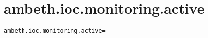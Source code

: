 \section{ambeth.ioc.monitoring.active}
\label{configuration:AmbethIocMonitoringActive}
\ClearAPI
\TODO
{}
\begin{lstlisting}[style=Props,caption={Usage example for \textit{ambeth.ioc.monitoring.active}}]
ambeth.ioc.monitoring.active=
\end{lstlisting}